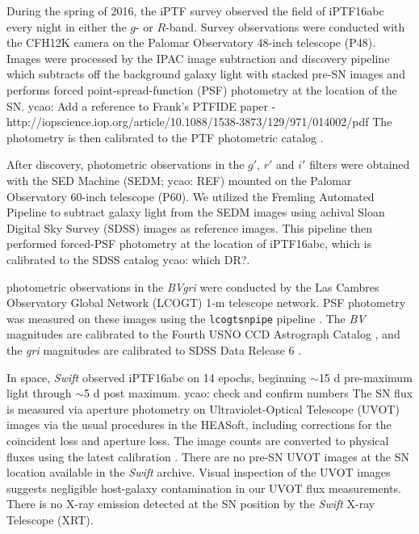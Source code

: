 \documentclass[twocolumn]{aastex61}
\newcommand{\ycao}[1]{{\color{red} ycao: {#1}}}
\begin{document}
During the spring of 2016, the iPTF survey observed the field of iPTF16abc every night in either the $g$- or $R$-band.
Survey observations were conducted with the
CFH12K camera \citep{2000SPIE.3965...58S} on the Palomar Observatory 48-inch telescope 
 (P48). Images were processed by the IPAC image
subtraction and discovery pipeline which subtracts off the background
galaxy light with stacked pre-SN images and performs forced
point-spread-function (PSF) photometry at the location of the SN.\ycao{Add a reference to Frank's PTFIDE paper - http://iopscience.iop.org/article/10.1088/1538-3873/129/971/014002/pdf} The
photometry is then calibrated to the PTF photometric catalog
\citep{2012PASP..124..854O}.

After discovery, photometric observations in the $g'$, $r'$ and $i'$
filters were obtained with the SED Machine 
(SEDM; \ycao{REF}) mounted on the Palomar Observatory 
60-inch telescope (P60). We utilized the Fremling Automated Pipeline \citep{2016A&A...593A..68F} to subtract galaxy light from the SEDM images using achival Sloan Digital Sky Survey (SDSS) images as reference images. This pipeline then performed forced-PSF photometry at the location of iPTF16abc, which is calibrated to the SDSS catalog \ycao{which DR?}.

photometric observations in the \textit{BVgri} were conducted by the Las Cambres Observatory Global Network (LCOGT) 1-m
telescope network.  PSF photometry was measured on these images using
the \texttt{lcogtsnpipe} pipeline \citep{2016MNRAS.459.3939V}. The
\textit{BV} magnitudes are calibrated to the Fourth USNO CCD
Astrograph Catalog \citep{2013AJ....145...44Z}, and the \textit{gri}
magnitudes are calibrated to SDSS Data Release 6
\citep{2008ApJS..175..297A}.

In space, \textit{Swift} observed iPTF16abc on 14 epochs, beginning $\sim$15 d pre-maximum light through $\sim$5 d post maximum. \ycao{check and confirm numbers} The SN flux is measured via aperture photometry on Ultraviolet-Optical
Telescope (UVOT) images via the usual procedures in the HEASoft, including corrections for the coincident loss and aperture loss. The image counts
are converted to physical fluxes using the latest calibration
\citep{2011AIPC.1358..373B}. There are no pre-SN UVOT images at the SN location available in the \textit{Swift} archive.  Visual inspection of the
UVOT images suggests negligible host-galaxy contamination in our UVOT flux measurements. There is no X-ray emission detected at the 
SN position by the \textit{Swift} X-ray Telescope (XRT).
\end{document}
